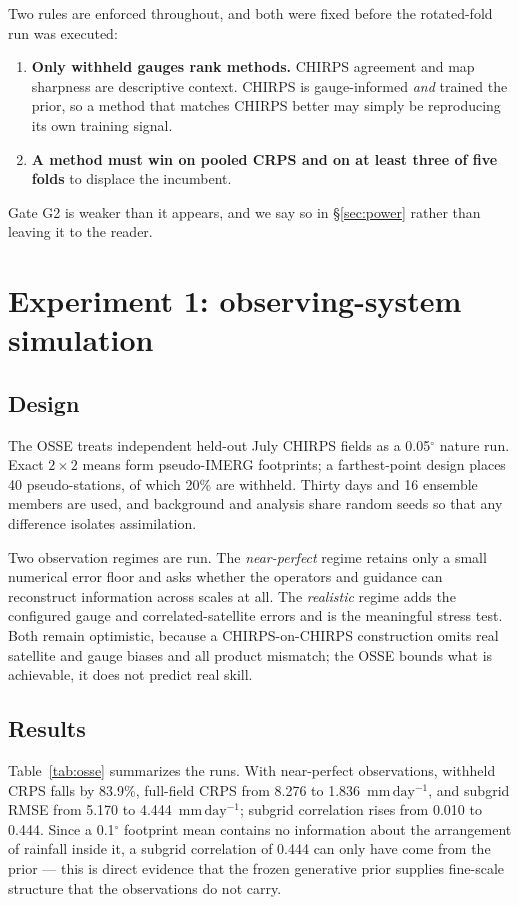 \documentclass[10pt,twocolumn]{article}
\newcommand{\mmday}{\mathrm{mm\,day^{-1}}}
\begin{document}
Two rules are enforced throughout, and both were fixed before the rotated-fold
run was executed:

\begin{enumerate}[label=\textbf{G\arabic{enumi}.}]
\item \textbf{Only withheld gauges rank methods.} CHIRPS agreement and map
sharpness are descriptive context. CHIRPS is gauge-informed \emph{and} trained
the prior, so a method that matches CHIRPS better may simply be reproducing
its own training signal.
\item \textbf{A method must win on pooled CRPS and on at least three of five
folds} to displace the incumbent.
\end{enumerate}

Gate G2 is weaker than it appears, and we say so in \S\ref{sec:power} rather
than leaving it to the reader.


\section{Experiment 1: observing-system simulation}
\label{sec:osse}

\subsection{Design}

The OSSE treats independent held-out July CHIRPS fields as a 0.05$^\circ$
nature run. Exact $2\times2$ means form pseudo-IMERG footprints; a
farthest-point design places 40 pseudo-stations, of which 20\% are withheld.
Thirty days and 16 ensemble members are used, and background and analysis share
random seeds so that any difference isolates assimilation.

Two observation regimes are run. The \emph{near-perfect} regime retains only a
small numerical error floor and asks whether the operators and guidance can
reconstruct information across scales at all. The \emph{realistic} regime adds
the configured gauge and correlated-satellite errors and is the meaningful
stress test. Both remain optimistic, because a CHIRPS-on-CHIRPS construction
omits real satellite and gauge biases and all product mismatch; the OSSE
bounds what is achievable, it does not predict real skill.

\subsection{Results}

Table~\ref{tab:osse} summarizes the runs. With near-perfect observations,
withheld CRPS falls by 83.9\%, full-field CRPS from 8.276 to 1.836~$\mmday$,
and subgrid RMSE from 5.170 to 4.444~$\mmday$; subgrid correlation rises from
0.010 to 0.444. Since a 0.1$^\circ$ footprint mean contains no information
about the arrangement of rainfall inside it, a subgrid correlation of 0.444
can only have come from the prior --- this is direct evidence that the frozen
generative prior supplies fine-scale structure that the observations do not
carry.
\end{document}

